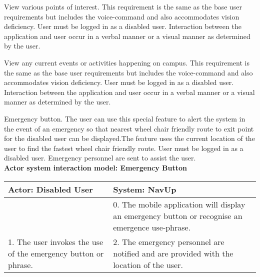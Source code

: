 \FuncReq
{View various points of interest.}
{This requirement is the same as the base user requirements but includes the voice-command and also accommodates vision deficiency.}
{User must be logged in as a disabled user.}
{Interaction between the application and user occur in a verbal manner or a visual manner as determined by the user.}

\FuncReq
{View any current events or activities happening on campus.}
{This requirement is the same as the base user requirements but includes the voice-command and also accommodates vision deficiency.}
{User must be logged in as a disabled user.}
{Interaction between the application and user occur in a verbal manner or a visual manner as determined by the user.}

\FuncReq
{Emergency button.}
{The user can use this special feature to alert the system in the event of an emergency so that nearest wheel chair friendly route to exit point for the disabled user can be displayed.The feature uses the current location of the user to find the fastest wheel chair friendly route.}
{User must be logged in as a disabled user.}
{Emergency personnel are sent to assist the user.}
    \\
    \textbf{Actor system interaction model: Emergency Button}\\
    \begin{tabular}{ | p{6cm} | p{6cm} |}
    \hline
    Actor: Disabled User & System: NavUp \\ \hline
     & 0. The mobile application will display an emergency button or recognise an emergence use-phrase.\\ \hline
    1. The user invokes the use of the emergency button or phrase. & 2. The emergency personnel are notified and are provided with the location of the user.\\ \hline   
    \end{tabular}
\\
\bigskip
